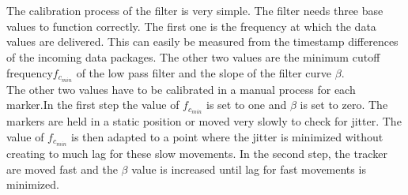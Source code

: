 \\\\The calibration process of the filter is very simple. The filter needs three base values to function correctly. The first one is the frequency at which the data values are delivered. This can easily be measured from the timestamp differences of the incoming data packages. The other two values are the minimum cutoff frequency$f_{c_{min}} $ of the low pass filter and the slope of the filter curve $\beta$.
\\The other two values have to be calibrated in a manual process for each marker.In the first step the value of $f_{c_{min}} $ is set to one and $\beta$ is set to zero. The markers are held in a static position or moved very slowly to check for jitter. The value of $f_{c_{min}} $ is then adapted to a point where the jitter is minimized without creating to much lag for these slow movements. In the second step, the tracker are moved fast and the $\beta$ value is increased until lag for fast movements is minimized.
